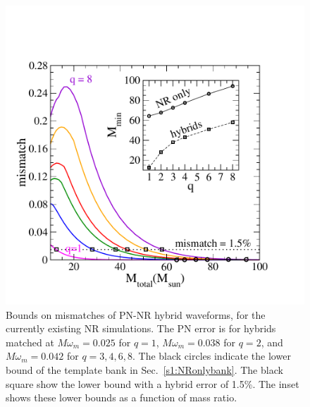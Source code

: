 \begin{figure}
\includegraphics[width=0.9\columnwidth, trim=20 17 75 75]{maxmismatchVSmass_allq.pdf}
\caption{\label{fig:Current-NR-PN-Errors}Bounds on mismatches of PN-NR
  hybrid waveforms, for the currently existing NR simulations. The PN
  error is for hybrids matched at $M\omega_m=0.025$ for $q=1$,
  $M\omega_m=0.038$ for $q=2$, and $M\omega_m=0.042$ for
  $q=3,4,6,8$. The black circles indicate the lower bound of the
  template bank in Sec.~\ref{s1:NRonlybank}. The black square show the
  lower bound with a hybrid error of 1.5\%. The inset shows these
  lower bounds as a function of mass ratio.} 
\end{figure}

